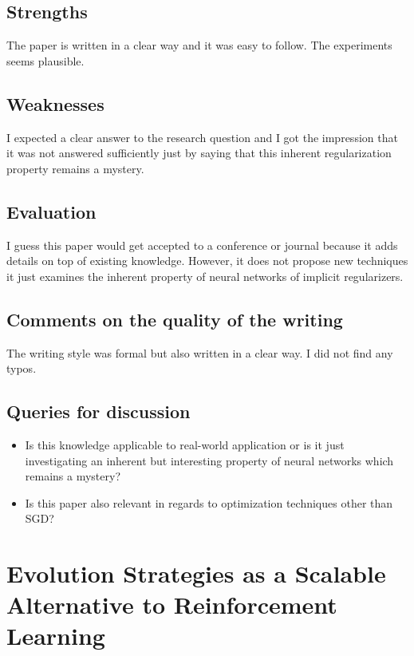 \documentclass[a4paper]{article}
\begin{document}
\subsection{Strengths}

The paper is written in a clear way and it was easy to follow. The experiments seems plausible.

\subsection{Weaknesses}

I expected a clear answer to the research question and I got the impression that it was not answered sufficiently just by saying that this inherent regularization property remains a mystery.

\subsection{Evaluation}

I guess this paper would get accepted to a conference or journal because it adds details on top of existing knowledge. However, it does not propose new techniques it just examines the inherent property of neural networks of implicit regularizers.

\subsection{Comments on the quality of the writing}

The writing style was formal but also written in a clear way. I did not find any typos.

\subsection{Queries for discussion}


\begin{itemize}
	\item Is this knowledge applicable to real-world application or is it just investigating an inherent but interesting property of neural networks which remains a mystery?
	\item Is this paper also relevant in regards to optimization techniques other than SGD?
\end{itemize}


\section{Evolution Strategies as a
Scalable Alternative to Reinforcement Learning}
\end{document}
